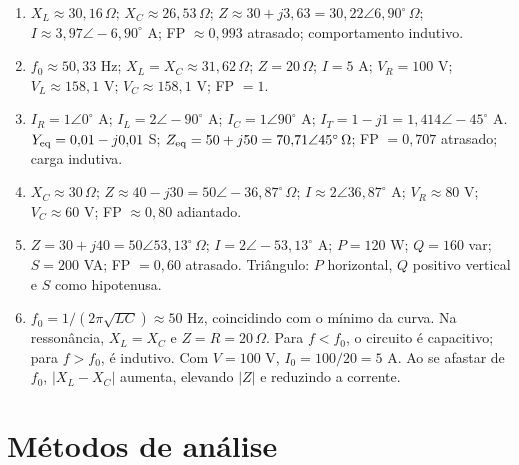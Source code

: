 \documentclass[12pt,a4paper]{article}
\begin{document}
\begin{enumerate}[label=\textbf{2.\arabic*.}]
\item $X_L\approx30{,}16\,\Omega$; $X_C\approx26{,}53\,\Omega$; $Z\approx30+j3{,}63=30{,}22\angle6{,}90^\circ\,\Omega$; $I\approx3{,}97\angle-6{,}90^\circ$ A; FP $\approx0{,}993$ atrasado; comportamento indutivo.
\item $f_0\approx50{,}33$ Hz; $X_L=X_C\approx31{,}62\,\Omega$; $Z=20\,\Omega$; $I=5$ A; $V_R=100$ V; $V_L\approx158{,}1$ V; $V_C\approx158{,}1$ V; FP $=1$.
\item $I_R=1\angle0^\circ$ A; $I_L=2\angle-90^\circ$ A; $I_C=1\angle90^\circ$ A; $I_T=1-j1=1{,}414\angle-45^\circ$ A. $Y_{\rm eq}=0{,}01-j0{,}01$ S; $Z_{\rm eq}=50+j50=70{,}71\angle45^\circ\,\Omega$; FP $=0{,}707$ atrasado; carga indutiva.
\item $X_C\approx30\,\Omega$; $Z\approx40-j30=50\angle-36{,}87^\circ\,\Omega$; $I\approx2\angle36{,}87^\circ$ A; $V_R\approx80$ V; $V_C\approx60$ V; FP $\approx0{,}80$ adiantado.
\item $Z=30+j40=50\angle53{,}13^\circ\,\Omega$; $I=2\angle-53{,}13^\circ$ A; $P=120$ W; $Q=160$ var; $S=200$ VA; FP $=0{,}60$ atrasado. Triângulo: $P$ horizontal, $Q$ positivo vertical e $S$ como hipotenusa.
\item $f_0=1/(2\pi\sqrt{LC})\approx50$ Hz, coincidindo com o mínimo da curva. Na ressonância, $X_L=X_C$ e $Z=R=20\,\Omega$. Para $f<f_0$, o circuito é capacitivo; para $f>f_0$, é indutivo. Com $V=100$ V, $I_0=100/20=5$ A. Ao se afastar de $f_0$, $|X_L-X_C|$ aumenta, elevando $|Z|$ e reduzindo a corrente.
\end{enumerate}

\newpage
\section{Métodos de análise}
\end{document}
